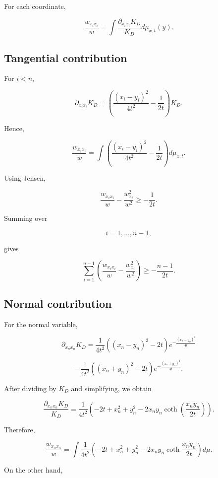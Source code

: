 \documentclass[11pt]{amsart}
\theoremstyle{definition}
\theoremstyle{remark}
\begin{document}
For each coordinate,

\[
\frac{w_{x_ix_i}}w
=
\int
\frac{\partial_{x_ix_i}K_D}
{K_D}
d\mu_{x,t}(y).
\]



\subsection{Tangential contribution}


For $i<n$,

\[
\partial_{x_ix_i}K_D
=
\left(
\frac{(x_i-y_i)^2}{4t^2}
-\frac1{2t}
\right)K_D .
\]

Hence,

\[
\frac{w_{x_ix_i}}w
=
\int
\left(
\frac{(x_i-y_i)^2}{4t^2}
-\frac1{2t}
\right)
d\mu_{x,t}.
\]


Using Jensen,

\[
\frac{w_{x_ix_i}}w
-
\frac{w_{x_i}^2}{w^2}
\geq
-\frac1{2t}.
\]


Summing over

\[
i=1,\ldots,n-1,
\]

gives

\[
\sum_{i=1}^{n-1}
\left(
\frac{w_{x_ix_i}}w
-
\frac{w_{x_i}^2}{w^2}
\right)
\geq
-\frac{n-1}{2t}.
\]



\subsection{Normal contribution}


For the normal variable,

\[
\partial_{x_nx_n}K_D
=
\frac1{4t^2}
\left(
(x_n-y_n)^2-\!2t
\right)
e^{-\frac{(x_n-y_n)^2}{4t}}
\]

\[
-
\frac1{4t^2}
\left(
(x_n+y_n)^2-\!2t
\right)
e^{-\frac{(x_n+y_n)^2}{4t}} .
\]


After dividing by $K_D$ and simplifying, we obtain

\[
\frac{\partial_{x_nx_n}K_D}
{K_D}
=
\frac1{4t^2}
\left(
-2t+x_n^2+y_n^2
-
2x_ny_n
\coth
\left(
\frac{x_ny_n}{2t}
\right)
\right).
\]


Therefore,

\[
\frac{w_{x_nx_n}}w
=
\int
\frac1{4t^2}
\left(
-2t+x_n^2+y_n^2
-
2x_ny_n
\coth
\frac{x_ny_n}{2t}
\right)
d\mu .
\]


On the other hand,
\end{document}
